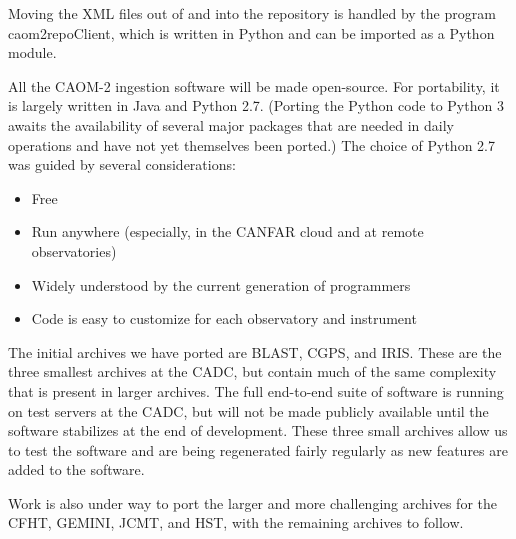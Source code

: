 Moving the XML files out of and into the repository is handled by the program caom2repoClient, which is written in Python and can be imported as a Python module.
 
All the CAOM-2 ingestion software will be made open-source.  For portability, it is largely written in Java and Python 2.7.  (Porting the Python code to Python 3 awaits the availability of several major packages that are needed in daily operations and have not yet themselves been ported.) The choice of Python 2.7 was guided by several considerations:
\begin{itemize}
\item Free
\item Run anywhere (especially, in the CANFAR cloud and at remote observatories)
\item Widely understood by the current generation of programmers
\item Code is easy to customize for each observatory and instrument
\end{itemize}

The initial archives we have ported are BLAST, CGPS, and IRIS.  These are the three smallest archives at the CADC, but contain much of the same complexity that is present in larger archives.  The full end-to-end suite of software is running on test servers at the CADC, but will not be made publicly available until the software stabilizes at the end of development.  These three small archives allow us to test the software and are being regenerated fairly regularly as new features are added to the software.

Work is also under way to port the larger and more challenging archives for the CFHT, GEMINI, JCMT, and HST, with the remaining archives to follow.


